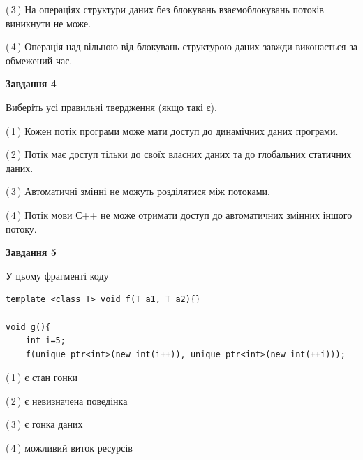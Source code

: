 \documentclass[12pt, ukrainian]{article}
\begin{document}
\begin {large}
{(\,3\,) На операціях структури даних без блокувань взаємоблокувань потоків виникнути не може.%

(\,4\,) Операція над вільною від блокувань структурою даних завжди виконається за обмежений час.%



\begin{center}
\textbf{Завдання 4}
\end{center}
Виберіть усі правильні твердження (якщо такі є).\par
\vspace{2mm}

(\,1\,) Кожен потік програми може мати доступ до динамічних даних програми.%

(\,2\,) Потік має доступ тільки до своїх власних даних та до глобальних статичних даних.%

(\,3\,) Автоматичні змінні не можуть розділятися між потоками.%

(\,4\,) Потік мови С++ не може отримати доступ до автоматичних змінних іншого потоку.%



\begin{center}
\textbf{Завдання 5}
\end{center}
У цьому фрагменті коду
\begin{verbatim}
template <class T> void f(T a1, T a2){}

void g(){
    int i=5;
    f(unique_ptr<int>(new int(i++)), unique_ptr<int>(new int(++i)));
\end{verbatim}

(\,1\,) є стан гонки%

(\,2\,) є невизначена поведінка%

(\,3\,) є гонка даних%

(\,4\,) можливий виток ресурсів%


}
\end {large}
\end{document}
